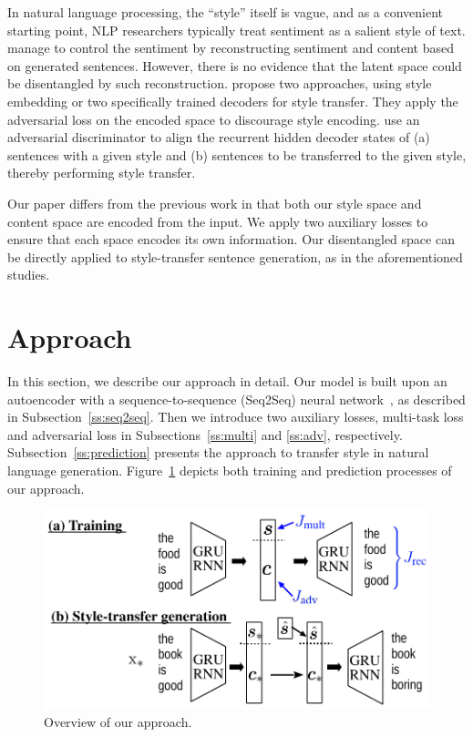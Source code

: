 \documentclass[11pt,a4paper]{article}
\begin{document}
In natural language processing, the ``style'' itself is vague, and as a convenient starting point, NLP researchers typically treat sentiment as a salient style of text.  manage to control the sentiment by reconstructing sentiment and content based on generated sentences. However, there is no evidence that the latent space could be disentangled by such reconstruction.  propose two approaches, using style embedding or two specifically trained decoders for style transfer. They apply the adversarial loss on the encoded space to discourage style encoding.  use an adversarial discriminator to align the recurrent hidden decoder states of (a) sentences with a given style and (b) sentences to be transferred to the given style, thereby performing style transfer.

Our paper differs from the previous work in that both our style space and content space are encoded from the input. We apply two auxiliary losses to ensure that each space encodes its own information. Our disentangled space can be directly applied to style-transfer sentence generation, as in the aforementioned studies.

\section{Approach}

In this section, we describe our approach in detail. Our model is built upon an autoencoder with a sequence-to-sequence (Seq2Seq) neural network~\cite{sutskever2014sequence}, as described in Subsection~\ref{ss:seq2seq}. Then we introduce two auxiliary losses, multi-task loss and adversarial loss in Subsections~\ref{ss:multi} and \ref{ss:adv}, respectively. Subsection~\ref{ss:prediction} presents the approach to transfer style in natural language generation. Figure~\ref{fig:model-overview} depicts both training and prediction processes of our approach.


\begin{figure}[ht]
	\centering
	\includegraphics[width=0.9\linewidth]{model-overview}
	\vspace{-.5cm}
	\caption{Overview of our approach.}
	\label{fig:model-overview}
	\vspace{-.3cm}
\end{figure}
\end{document}
